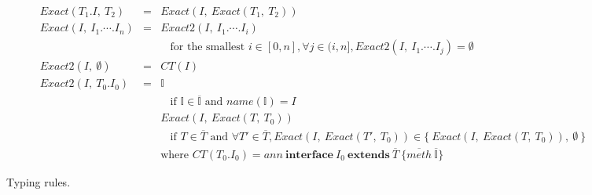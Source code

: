 \begin{figure*}[t]
\[\begin{array}{lll}
Exact(T_1.I,\ T_2) & = & Exact(I,\ Exact(T_1,\ T_2)) \\
Exact(I,\ I_1.\cdots.I_n) & = & Exact2(I,\ I_1.\cdots.I_i) \\
& & \ \ \ \ \textrm{for the smallest }i\in[0,n],\forall j\in(i,n],Exact2(I,\ I_1.\cdots.I_j) = \emptyset \\
Exact2(I,\ \emptyset) & = & CT(I) \\
Exact2(I,\ T_0.I_0) & = & \mathbb{I} \\
& & \ \ \ \ \textrm{if } \mathbb{I}\in\overline{\mathbb{I}} \textrm{ and } name(\mathbb{I})=I \\
& & Exact(I,\ Exact(T,\ T_0)) \\
& & \ \ \ \ \textrm{if } T\in\overline{T} \textrm{ and }\forall T'\in\overline{T}, Exact(I,\ Exact(T',\ T_0))\in\{\ Exact(I,\ Exact(T,\ T_0)),\ \emptyset\ \} \\
& & \textrm{where } CT(T_0.I_0) = ann\ \mathbf{interface}\ I_0\ \mathbf{extends}\ \overline{T}\ \{\overline{meth}\ \overline{\mathbb{I}}\}
\end{array}\]
\caption{Typing rules.}
\end{figure*}
